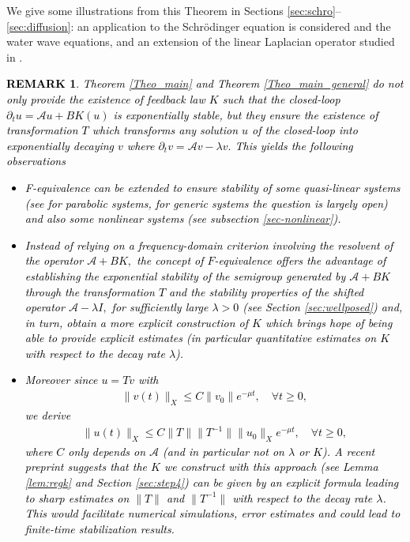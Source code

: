 \documentclass[11pt, dvipsnames]{amsart}
\newtheorem{rmk}[theorem]{REMARK}
\begin{document}
We give some illustrations from this Theorem in Sections \ref{sec:schro}--\ref{sec:diffusion}: 
an application to the Schrödinger equation is considered and the water wave equations, and an extension of the linear Laplacian operator studied in \cite{Gagnon2022-fredholm-laplacien}.\\
\textcolor{black}{\begin{rmk}
    Theorem \ref{Theo_main} and Theorem \ref{Theo_main_general} do not only provide the existence of feedback law $K$ such that the closed-loop $\partial_t u=\mathcal{A}u+BK(u)$ is exponentially stable, but they ensure the existence of transformation $T$ which transforms any solution $u$ of the closed-loop into exponentially decaying $v$ where $\partial_t v=\mathcal{A}v-\lambda v.$ This yields the following observations
    \begin{itemize}
        \item F-equivalence can be extended to ensure stability of some quasi-linear systems (see \cite{Boulard2025f} for parabolic systems, for generic systems the question is largely open) and also some nonlinear systems (see subsection \ref{sec-nonlinear}). 
        \item Instead of relying on a frequency-domain criterion involving the resolvent of the operator $\mathcal{A}+BK,$ the concept of $F$-equivalence offers the advantage of establishing the exponential stability of the semigroup generated by $\mathcal{A}+BK$ through the transformation $T$ and the stability properties of the shifted operator $\mathcal{A}-\lambda I,$ for sufficiently large $\lambda>0$ (see Section \ref{sec:wellposed}) and, in turn, obtain a more explicit construction of $K$ which brings hope of being able to provide explicit estimates (in particular quantitative estimates on $K$ with respect to the decay rate $\lambda$).
        \item Moreover since $u=Tv$ with
    \begin{align*}
    \|v(t)\|_{X}\leq C\|v_0\|e^{-\mu t},\quad \forall t\geq 0,
    \end{align*}
    we derive
    \begin{align*}
    \|u(t)\|_{X}\leq C\|T\|\|T^{-1}\|\|u_0\|_Xe^{-\mu t},\quad \forall t\geq 0,
    \end{align*}
    where $C$ only depends on $\mathcal{A}$ (and in particular not on $\lambda$ or $K$). A recent preprint \cite{Gagnon2025abstract} suggests that the $K$ we construct with this approach (see Lemma \ref{lem:regk} and Section \ref{sec:step4}) can be given by an explicit formula leading to sharp estimates on $\|T\|$ and $\|T^{-1}\|$ with respect to the decay rate $\lambda$. This would facilitate numerical simulations, error estimates and could lead to finite-time stabilization results. 
    \end{itemize}   
\end{rmk}}
\end{document}
